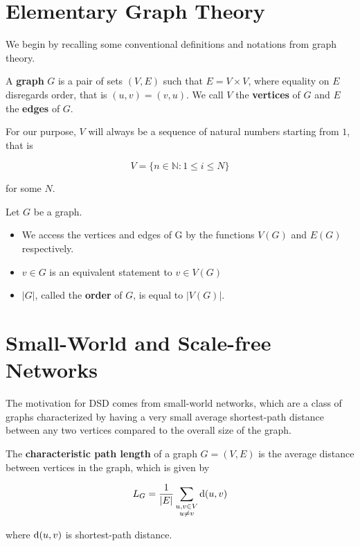 \section{Elementary Graph Theory}

We begin by recalling some conventional definitions and notations from graph
theory.

\begin{definition}
  A \textbf{graph} $G$ is a pair of sets $(V,E)$ such that $E = V \times V$,
  where equality on $E$ disregards order, that is $(u,v) = (v,u)$. We call $V$
  the \textbf{vertices} of $G$ and $E$ the \textbf{edges} of $G$.
\end{definition}

For our purpose, $V$ will always be a sequence of natural numbers starting from
$1$, that is

\[
  V = \{ n \in \mathbb{N} : 1 \leq i \leq N \}
\]

for some $N$.

\begin{remark}[Notation]
  Let $G$ be a graph.

  \begin{itemize}
  \item We access the vertices and edges of G by the functions $V(G)$ and $E(G)$
    respectively.
  \item $v \in G$ is an equivalent statement to $v \in V(G)$
  \item $|G|$, called the \textbf{order} of $G$, is equal to $|V(G)|$.
  \end{itemize}
\end{remark}

\section{Small-World and Scale-free Networks}

The motivation for DSD comes from small-world networks, which are a class of
graphs characterized by having a very small average shortest-path distance
between any two vertices compared to the overall size of the graph.


\begin{definition}
  The \textbf{characteristic path length} of a graph $G = (V,E)$ is the average
  distance between vertices in the graph, which is given by

  \[ L_G = \frac{1}{|E|} \sum_{\substack{u,v \in V \\ u \neq v}} \mathrm{d}(u,v)\]

  where $\mathrm{d}(u,v)$ is shortest-path distance. 
\end{definition}

